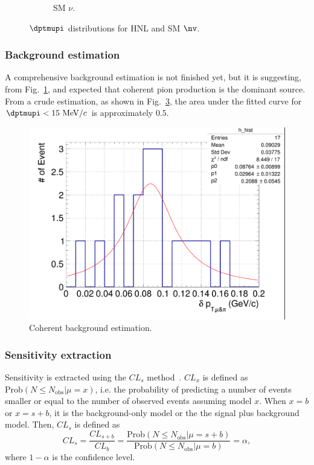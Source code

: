 \begin{figure}[!htb]
\begin{subfigure}{0.45\textwidth}
                \caption{SM $\nu$.}
                \label{fig:sm-mupidpt}
           \end{subfigure}
           \caption{$\dptmupi$ distributions for HNL and SM $\nv$.}
           \label{fig:mmupi-dpt}
        \end{figure}

    
    \subsubsection{Background estimation}
        A comprehensive background estimation is not finished yet, but it is suggesting, from Fig.~\ref{fig:sm-mupidpt}, and expected that coherent pion production is the dominant source. 
        From a crude estimation, as shown in Fig.~\ref{fig:coh-bkg}, the area under the fitted curve for $\dptmupi<15~\mevc$ is approximately $0.5$. 
        \begin{figure}[!htb] 
            \centering
            \includegraphics[width=0.5\linewidth]{figures/COH.png}
            \caption{Coherent background estimation.}
            \label{fig:coh-bkg}
        \end{figure}    
        
    \subsubsection{Sensitivity extraction}
        Sensitivity is extracted using the $CL_s$ method~\cite{Read_2002}.
        $CL_x$ is defined as $\textrm{Prob}(N\leq N_{\textrm{obs}}| \mu = x)$, i.e. the probability of predicting a number of events smaller or equal to the number of observed events assuming model $x$. When $x=b$ or $x=s+b$, it is the background-only model or the the signal plus background model.
        Then, $CL_s$ is defined as 
        \begin{equation}
            CL_s = \frac{CL_{s+b}}{CL_{b}} = \frac{\textrm{Prob}(N\leq N_{\textrm{obs}}| \mu = s+b)}{\textrm{Prob}(N\leq N_{\textrm{obs}}| \mu = b)} = \alpha,
        \end{equation}
        where $1-\alpha$ is the confidence level.

